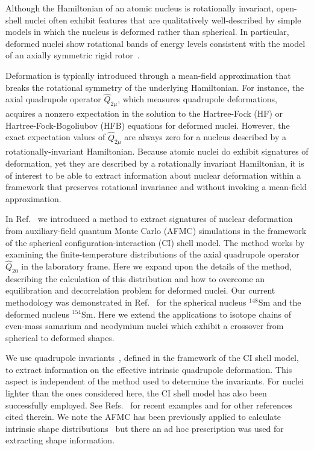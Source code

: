 \documentclass[prc,twocolumn,aps,showpacs,floatfix,nofootinbib,letterpaper,preprintnumbers]{revtex4-1}
\begin{document}
Although the Hamiltonian of an atomic nucleus is rotationally invariant, open-shell nuclei often exhibit features that are qualitatively well-described by simple models in which the nucleus is deformed rather than spherical. In particular, deformed nuclei show rotational bands of energy levels consistent with the model of an axially symmetric rigid rotor~\cite{BM75}. 

Deformation is typically introduced through a mean-field approximation that breaks the rotational symmetry of the underlying Hamiltonian. For instance, the axial quadrupole operator $\hat{Q}_{2\mu}$, which measures quadrupole deformations, acquires a nonzero expectation in the solution to the Hartree-Fock (HF) or Hartree-Fock-Bogoliubov (HFB) equations for deformed nuclei.
However, the exact expectation values of $\hat{Q}_{2\mu}$ are always zero for a nucleus described by a rotationally-invariant Hamiltonian. Because atomic nuclei do exhibit signatures of deformation, yet they are described by a rotationally invariant Hamiltonian, it is of interest to be able to extract information about nuclear deformation within a framework that preserves rotational invariance and without invoking a mean-field approximation.   

In Ref.~\cite{al14} we introduced a method to extract signatures of nuclear
deformation from auxiliary-field quantum Monte Carlo (AFMC) simulations in
the framework of the spherical configuration-interaction (CI) shell model.
The method works by examining the finite-temperature distributions of the
axial quadrupole operator $\hat{Q}_{20}$ in the laboratory frame. Here we
expand upon the details of the method, describing the calculation of this
distribution and how to overcome an equilibration and decorrelation problem
for deformed nuclei.  Our current methodology was demonstrated 
in Ref.~\cite{al14} for the spherical nucleus
$^{148}$Sm and the deformed nucleus $^{154}$Sm. Here we extend the
applications to isotope chains of even-mass samarium and neodymium nuclei
which exhibit a crossover from spherical to deformed shapes.

We use quadrupole invariants~\cite{ku72,cl86}, defined
in the framework of the CI shell model, to extract information on the
effective intrinsic quadrupole deformation.  This aspect is independent
of the method used to determine the invariants.  For nuclei lighter
than the ones considered here, the CI shell model has also been successfully
employed.  See Refs.~\cite{ha16,sc17} for recent examples and for other references cited therein.  We note the AFMC has been previously applied
to  calculate intrinsic shape distributions~\cite{al96}  but there an ad hoc prescription was used for extracting
shape information. 
\end{document}
